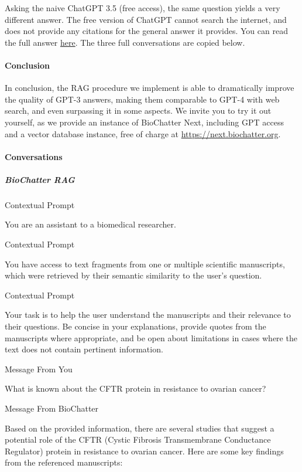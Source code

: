 Asking the naive ChatGPT 3.5 (free access), the same question yields a very
different answer. The free version of ChatGPT cannot search the internet, and
does not provide any citations for the general answer it provides. You can read
the full answer
\href{https://chat.openai.com/share/810075aa-69fe-4c06-859d-229e250f4c41}{here}. The
three full conversations are copied below.

\hypertarget{conclusion-1}{%
\paragraph{Conclusion}\label{conclusion-1}}

In conclusion, the RAG procedure we implement is able to dramatically improve
the quality of GPT-3 answers, making them comparable to GPT-4 with web search,
and even surpassing it in some aspects. We invite you to try it out yourself, as
we provide an instance of BioChatter Next, including GPT access and a vector
database instance, free of charge at
\url{https://next.biochatter.org}.

\hypertarget{conversations}{%
\paragraph{Conversations}\label{conversations}}

\hypertarget{biochatter-rag}{%
\subparagraph{BioChatter RAG}\label{biochatter-rag}}

Contextual Prompt

You are an assistant to a biomedical researcher.

Contextual Prompt

You have access to text fragments from one or multiple scientific manuscripts, which were retrieved by their semantic similarity to the user's question.

Contextual Prompt

Your task is to help the user understand the manuscripts and their relevance to their questions. Be concise in your explanations, provide quotes from the manuscripts where appropriate, and be open about limitations in cases where the text does not contain pertinent information.

Message From You

What is known about the CFTR protein in resistance to ovarian cancer?

Message From BioChatter

Based on the provided information, there are several studies that suggest a potential role of the CFTR (Cystic Fibrosis Transmembrane Conductance Regulator) protein in resistance to ovarian cancer. Here are some key findings from the referenced manuscripts:

